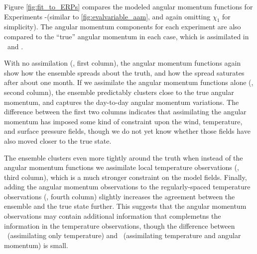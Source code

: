 Figure \ref{fig:fit_to_ERPs} compares the modeled angular momentum functions for Experiments \NODA-\ERPRST (similar to \ref{fig:evalvariable_aam}, and again omitting $\chi_1$ for simplicity). 
The angular momentum components for each experiment are also compared to the ``true'' angular momentum in each case, which is assimilated in \ERPALL ~and \ERPRST.  

With no assimilation (\NODA, first column), the angular momentum functions again show how the ensemble spreads about the truth, and how the spread saturates after about one month.
If we assimilate the angular momentum functions alone (\ERPALL, second column), the ensemble predictably clusters close to the true angular momentum, and captures the day-to-day angular momentum variations. 
The difference between the first two columns indicates that assimilating the angular momentum has imposed some kind of constraint upon the wind, temperature, and surface pressure fields, though we do not yet know whether those fields have also moved closer to the true state. 

The ensemble clusters even more tightly around the truth when instead of the angular momentum functions we assimilate local temperature observations (\RST, third column), which is a much stronger constraint on the model fields. 
Finally, adding the angular momentum observations to the regularly-spaced temperature observations (\ERPRST, fourth column) slightly increases the agreement between the ensemble and the true state further.  
This suggests that the angular momentum observations may contain additional information that complemetns the information in the temperature observations, though the difference between \RST ~(assimilating only temperature) and \ERPRST ~(assimilating temperature and angular momentum) is small.  
